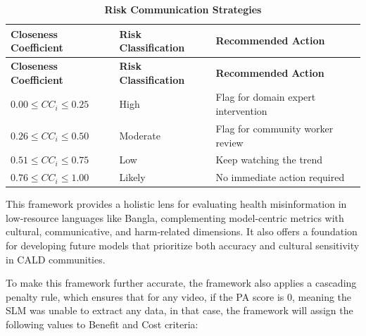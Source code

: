 \documentclass[]{article}
\begin{document}
\begin{longtable}[]{@{}
  >{\raggedright\arraybackslash}p{}
  >{\raggedright\arraybackslash}p{}
  >{\raggedright\arraybackslash}p{}@{}}
\caption{\textbf{Risk Communication
Strategies}}\tabularnewline
\toprule\noalign{}
\begin{minipage}[b]{\linewidth}\raggedright
\textbf{Closeness Coefficient}
\end{minipage} & \begin{minipage}[b]{\linewidth}\raggedright
\textbf{Risk} \textbf{Classification}
\end{minipage} & \begin{minipage}[b]{\linewidth}\raggedright
\textbf{Recommended} \textbf{Action}
\end{minipage} \\
\midrule\noalign{}
\endfirsthead
\toprule\noalign{}
\begin{minipage}[b]{\linewidth}\raggedright
\textbf{Closeness Coefficient}
\end{minipage} & \begin{minipage}[b]{\linewidth}\raggedright
\textbf{Risk} \textbf{Classification}
\end{minipage} & \begin{minipage}[b]{\linewidth}\raggedright
\textbf{Recommended} \textbf{Action}
\end{minipage} \\
\midrule\noalign{}
\endhead
\bottomrule\noalign{}
\endlastfoot
\(0.00 \leq CC_{i} \leq 0.25\) & High & Flag for domain expert
intervention \\
\(0.26 \leq CC_{i} \leq 0.50\) & Moderate & Flag for community worker
review \\
\(0.51 \leq CC_{i} \leq 0.75\) & Low & Keep watching the trend \\
\(0.76 \leq CC_{i} \leq 1.00\) & Likely & No immediate action
required \\
\end{longtable}

This framework provides a holistic lens for evaluating health
misinformation in low‑resource languages like Bangla, complementing
model‑centric metrics with cultural, communicative, and harm‑related
dimensions. It also offers a foundation for developing future models
that prioritize both accuracy and cultural sensitivity in CALD
communities.

To make this framework further accurate, the framework also applies a cascading penalty rule, which ensures that for any video, if the PA score is 0, meaning the SLM was unable to extract any data, in that case, the framework will assign the following values to Benefit and Cost criteria:
\end{document}
